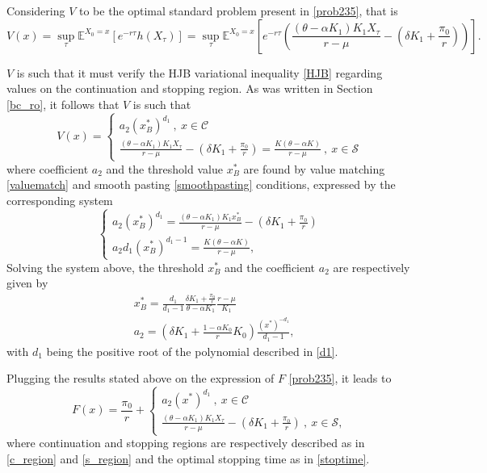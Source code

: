 Considering $V$ to be the optimal standard problem present in \eqref{prob235}, that is
\begin{equation}
V(x)=  \sup _\tau \mathds{E}^{X_0=x} \left[ e^{-r\tau}h(X_\tau) \right] 
=\sup _\tau \mathds{E}^{X_0=x} \left[ e^{-r\tau}\left(\frac{(\theta-\alpha K_1)K_1 X_\tau}{r-\mu} - \left( \delta K_1  +\frac{\pi_0}{r}\right)  \right) \right].
\end{equation} 

$V$ is such that it must verify the HJB variational inequality \eqref{HJB} regarding values on the continuation and stopping region. As was written in Section \ref{bc_ro}, it follows that $V$ is such that
\begin{equation}
V(x)=\begin{cases} a_2(x_B^*)^{d_1} \ , \ x \in \mathcal{C} \\
\frac{(\theta-\alpha K_1)K_1 X_\tau}{r-\mu} - \left( \delta K_1  +\frac{\pi_0}{r}\right)=\frac{K(\theta-\alpha K)}{r-\mu} \ , \ x \in \mathcal{S}
\end{cases}
\end{equation}
where coefficient $a_2$ and the threshold value $x_B^*$ are found by value matching \eqref{valuematch} and smooth pasting \eqref{smoothpasting} conditions, expressed by the corresponding system
\begin{equation}
\begin{cases} a_2(x_B^*)^{d_1}=\frac{(\theta-\alpha K_1)K_1 x_B^*}{r-\mu} - \left( \delta K_1  +\frac{\pi_0}{r}\right) \\
a_2d_1(x_B^*)^{d_1-1}=\frac{K(\theta-\alpha K)}{r-\mu},
\end{cases}
\label{eq:sistema2}
\end{equation}
Solving the system above, the threshold $x_B^*$ and the coefficient $a_2$ are respectively given by
\begin{align}
&x_B^*=\frac{d_1}{d_1-1} \frac{ \delta K_1  +\frac{\pi_0}{r} }{\theta-\alpha K_1} \frac{r-\mu}{K_1} \label{2_xB} \\
&a_2=\left( \delta K_1 +\frac{1-\alpha K_0}{r}K_0 \right) \frac{(x^*)^{-d_1}}{d_1-1} \label{2_aB},
\end{align}
with $d_1$ being the positive root of the polynomial described in \eqref{d1}.

Plugging the results stated above on the expression of $F$ \eqref{prob235}, it leads to
\begin{equation}
F(x)=\frac{\pi_0}{r}+\begin{cases} a_2(x^*)^{d_1} \ , \ x \in \mathcal{C} \\
\frac{(\theta-\alpha K_1)K_1 X_\tau}{r-\mu} - \left( \delta K_1  +\frac{\pi_0}{r}\right) \ , \ x \in \mathcal{S},
\label{2:Fbm}
\end{cases}
\end{equation}
where continuation and stopping regions are respectively described as in \eqref{c_region} and \eqref{s_region} and the optimal stopping time as in \eqref{stoptime}.




